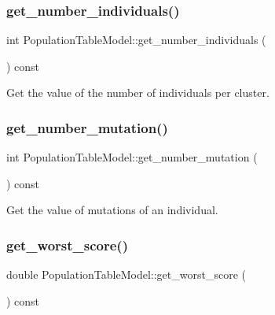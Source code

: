 \subsubsection{\texorpdfstring{get\+\_\+number\+\_\+individuals()}{get\_number\_individuals()}}
{\footnotesize\ttfamily int Population\+Table\+Model\+::get\+\_\+number\+\_\+individuals (\begin{DoxyParamCaption}{ }\end{DoxyParamCaption}) const}



Get the value of the number of individuals per cluster. 

\mbox{\label{class_population_table_model_a0ead9e7e42e6a143a30367cdf990919c}} 
\subsubsection{\texorpdfstring{get\+\_\+number\+\_\+mutation()}{get\_number\_mutation()}}
{\footnotesize\ttfamily int Population\+Table\+Model\+::get\+\_\+number\+\_\+mutation (\begin{DoxyParamCaption}{ }\end{DoxyParamCaption}) const}



Get the value of mutations of an individual. 

\mbox{\label{class_population_table_model_a41c9b5e0e1dba64fcfadf53320dc0572}} 
\subsubsection{\texorpdfstring{get\+\_\+worst\+\_\+score()}{get\_worst\_score()}}
{\footnotesize\ttfamily double Population\+Table\+Model\+::get\+\_\+worst\+\_\+score (\begin{DoxyParamCaption}{ }\end{DoxyParamCaption}) const}



